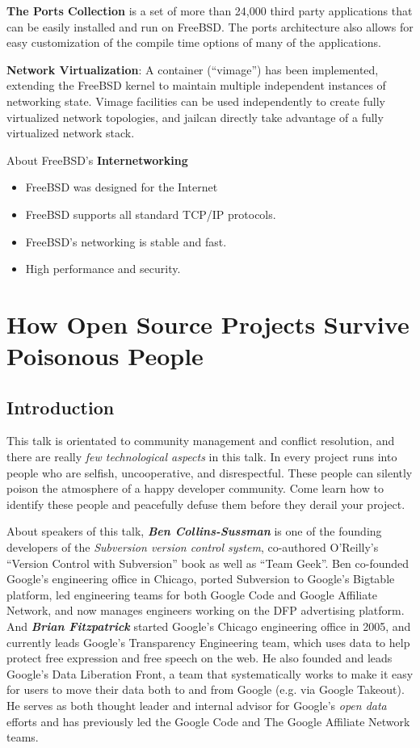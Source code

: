 \documentclass[11pt]{article}
\begin{document}
    \textbf{The Ports Collection }is a set of more than 24,000 third party applications that can be easily installed and run on FreeBSD. The ports architecture also allows for easy customization of the compile time options of many of the applications.
    
    \textbf{Network Virtualization}: A container (``vimage'') has been implemented, extending the FreeBSD kernel to maintain multiple independent instances of networking state. Vimage facilities can be used independently to create fully virtualized network topologies, and jailcan directly take advantage of a fully virtualized network stack.

About FreeBSD's \textbf{Internetworking}
\begin{itemize}
	\item FreeBSD was designed for the Internet
	\item FreeBSD supports all standard TCP/IP protocols.	
	\item FreeBSD's networking is stable and fast.
	\item High performance and security.
\end{itemize}


\newpage


\section{How Open Source Projects Survive Poisonous People}

\subsection{Introduction}
This talk is orientated to community management and conflict resolution, and there are really \emph{few technological aspects} in this talk. In every project runs into people who are selfish, uncooperative, and disrespectful. These people can silently poison the atmosphere of a happy developer community. Come learn how to identify these people and peacefully defuse them before they derail your project.

About speakers of this talk, \textbf{\emph{Ben Collins-Sussman}} is one of the founding developers of the \emph{Subversion version control system}, co-authored O'Reilly's ``Version Control with Subversion'' book as well as ``Team Geek''. Ben co-founded Google's engineering office in Chicago, ported Subversion to Google's Bigtable platform, led engineering teams for both Google Code and Google Affiliate Network, and now manages engineers working on the DFP advertising platform. And \textbf{\emph{Brian Fitzpatrick} }started Google's Chicago engineering office in 2005, and currently leads Google's Transparency Engineering team, which uses data to help protect free expression and free speech on the web. He also founded and leads Google's Data Liberation Front, a team that systematically works to make it easy for users to move their data both to and from Google (e.g. via Google Takeout). He serves as both thought leader and internal advisor for Google's \emph{open data }efforts and has previously led the Google Code and The Google Affiliate Network teams. 
\end{document}
